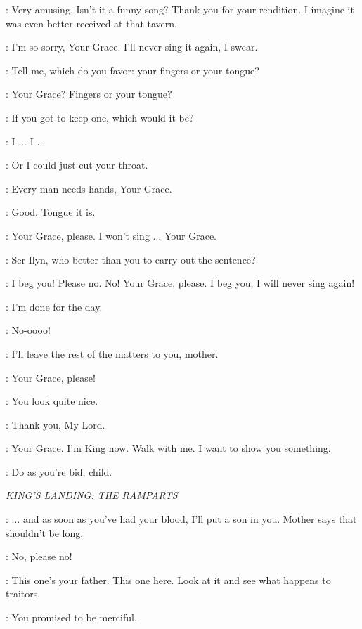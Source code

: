 \JOFFREY: Very amusing. Isn't it a funny song? Thank you for your rendition. I imagine it was even better received at that tavern. 

\MARILLION: I'm so sorry, Your Grace. I'll never sing it again, I swear. 

\JOFFREY: Tell me, which do you favor: your fingers or your tongue? 

\MARILLION: Your Grace? Fingers or your tongue? 

\JOFFREY: If you got to keep one, which would it be? 

\MARILLION: I $\ldots$ I $\ldots$  

\JOFFREY: Or I could just cut your throat. 

\MARILLION: Every man needs hands, Your Grace. 

\JOFFREY: Good. Tongue it is. 

\MARILLION: Your Grace, please. I won't sing $\ldots$ Your Grace. 

\JOFFREY: Ser Ilyn, who better than you to carry out the sentence? 

\MARILLION: I beg you! Please no. No! Your Grace, please. I beg you, I will never sing again! 

\JOFFREY: I'm done for the day. 

\MARILLION: No-oooo! 

\JOFFREY: I'll leave the rest of the matters to you, mother. 

\MARILLION: Your Grace, please! 

\JOFFREY: You look quite nice. 

\SANSA: Thank you, My Lord. 

\JOFFREY: Your Grace. I'm King now. Walk with me. I want to show you something. 

\HOUND: Do as you're bid, child. 


\scene

\textit{KING'S LANDING: THE RAMPARTS} 


\JOFFREY: $\ldots$ and as soon as you've had your blood, I'll put a son in you. Mother says that shouldn't be long. 

\SANSA:  No, please no! 

\JOFFREY: This one's your father. This one here. Look at it and see what happens to traitors. 

\SANSA: You promised to be merciful. 

